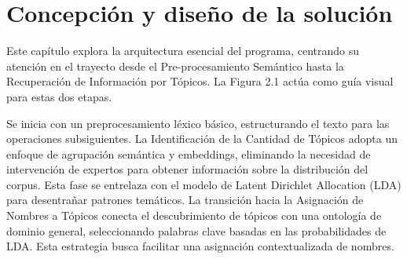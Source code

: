 \chapter{Concepción y dise\~no de la solución}\label{chapter:proposal}

%

Este capítulo explora la arquitectura esencial del programa, centrando su atención en el trayecto desde el Pre-procesamiento Sem\'antico hasta la Recuperación de Informaci\'on por Tópicos. La Figura 2.1 actúa como guía visual para estas dos etapas.

Se inicia con un preprocesamiento léxico básico, estructurando el texto para las operaciones subsiguientes. La Identificación de la Cantidad de Tópicos adopta un enfoque de agrupación semántica y embeddings, eliminando la necesidad de intervención de expertos para obtener información sobre la distribución del corpus. Esta fase se entrelaza con el modelo de Latent Dirichlet Allocation (LDA) para desentrañar patrones temáticos. La transición hacia la Asignación de Nombres a Tópicos conecta el descubrimiento de tópicos con una ontología de dominio general, seleccionando palabras clave basadas en las probabilidades de LDA. Esta estrategia busca facilitar una asignación contextualizada de nombres.

